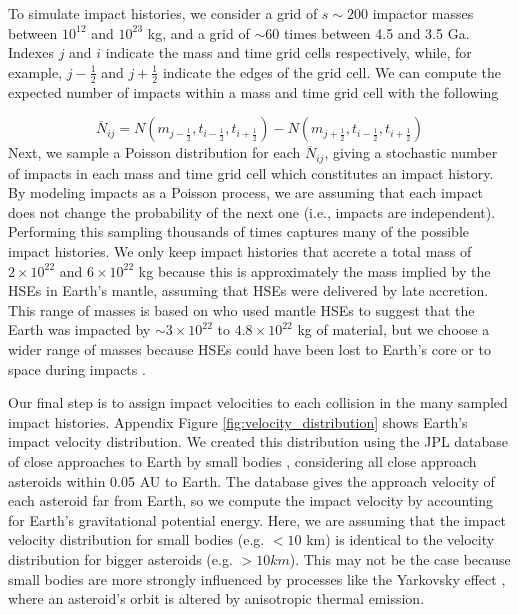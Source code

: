\documentclass[manuscript]{aastex63}
\begin{document}
To simulate impact histories, we consider a grid of $s\sim 200$ impactor masses between $10^{12}$ and $10^{23}$ kg, and a grid of $\sim 60$ times between 4.5 and 3.5 Ga. Indexes $j$ and $i$ indicate the mass and time grid cells respectively, while, for example, $j-\frac{1}{2}$ and $j+\frac{1}{2}$ indicate the edges of the grid cell. We can compute the expected number of impacts within a mass and time grid cell with the following

\begin{equation}
  \overline{N}_{ij} = N(m_{j-\frac{1}{2}},t_{i-\frac{1}{2}},t_{i+\frac{1}{2}}) - N(m_{j+\frac{1}{2}},t_{i-\frac{1}{2}},t_{i+\frac{1}{2}})
\end{equation}
Next, we sample a Poisson distribution for each $\overline{N}_{ij}$, giving a stochastic number of impacts in each mass and time grid cell which constitutes an impact history. By modeling impacts as a Poisson process, we are assuming that each impact does not change the probability of the next one (i.e., impacts are independent). Performing this sampling thousands of times captures many of the possible impact histories. We only keep impact histories that accrete a total mass of $2 \times 10^{22}$ and $6 \times 10^{22}$ kg because this is approximately the mass implied by the HSEs in Earth's mantle, assuming that HSEs were delivered by late accretion. This range of masses is based on \citet{Day_2015} who used mantle HSEs to suggest that the Earth was impacted by $\sim 3 \times 10^{22}$ to $4.8 \times 10^{22}$ kg of material, but we choose a wider range of masses because HSEs could have been lost to Earth's core or to space during impacts \citep{Marchi_2018}.

Our final step is to assign impact velocities to each collision in the many sampled impact histories. Appendix Figure \ref{fig:velocity_distribution} shows Earth's impact velocity distribution. We created this distribution using the JPL database of close approaches to Earth by small bodies \citep{Park_2023}, considering all close approach asteroids within 0.05 AU to Earth. The database gives the approach velocity of each asteroid far from Earth, so we compute the impact velocity by accounting for Earth's gravitational potential energy. Here, we are assuming that the impact velocity distribution for small bodies (e.g. $< 10$ km) is identical to the velocity distribution for bigger asteroids (e.g. $> 10 km$). This may not be the case because small bodies are more strongly influenced by processes like the Yarkovsky effect \citep{Bottke_2006}, where an asteroid's orbit is altered by anisotropic thermal emission.
\end{document}
